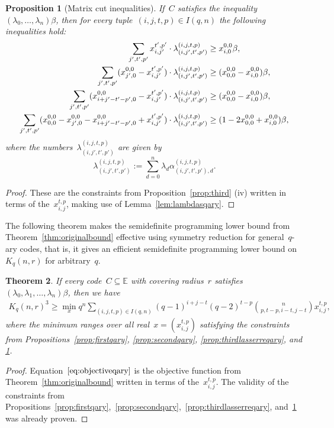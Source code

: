 \documentclass[10pt,a4paper]{article}
\newtheorem{theorem}{Theorem}[section]
\newtheorem{proposition}[theorem]{Proposition}
\theoremstyle{definition}
\begin{document}
\begin{proposition}[Matrix cut inequalities]\label{prop:thirdmatrixcutqary} If~$C$ satisfies the inequality $(\lambda_0,\ldots,\lambda_n)\beta$, then for every tuple~$(i,j,t,p) \in I(q,n)$ the following inequalities hold:
\begin{align} \label{constraints:matrixcutqary}
    \sum_{j',t',p'} x_{i,j'}^{t',p'} \cdot \lambda_{(i,j',t',p')}^{(i,j,t,p)} & \geq x_{i,0}^{0,0} \beta, \\
    \sum_{j',t',p'} (x_{j',0}^{0,0} - x_{i,j'}^{t',p'}) \cdot \lambda_{(i,j',t',p')}^{(i,j,t,p)}& \geq (x_{0,0}^{0,0} -  x_{i,0}^{0,0}) \beta, \notag\\
    \sum_{j',t',p'} (x_{i+j'-t'-p',0}^{0,0} - x_{i,j'}^{t',p'} )\cdot \lambda_{(i,j',t',p')}^{(i,j,t,p)} & \geq (x_{0,0}^{0,0} -  x_{i,0}^{0,0}) \beta,\notag\\
    \sum_{j',t',p'} (x_{0,0}^{0,0} - x_{j',0}^{0,0} -x_{i+j'-t'-p',0}^{0,0} + x_{i,j'}^{t',p'} )\cdot \lambda_{(i,j',t',p')}^{(i,j,t,p)} & \geq (1-2x_{0,0}^{0,0} +  x_{i,0}^{0,0}) \beta, \notag
\end{align}
where the numbers~$\lambda_{(i,j',t',p')}^{(i,j,t,p)}$ are given by
\[
\lambda_{(i,j',t',p')}^{(i,j,t,p)} := \sum_{d=0}^n \lambda_d \alpha_{(i,j',t',p'),d}^{(i,j,t,p)}.
\]
\end{proposition}
\begin{proof} 
These are the constraints from Proposition~\ref{prop:third} (iv) written in terms of the~$x_{i,j}^{t,p}$, making use of Lemma~\ref{lem:lambdasqary}. 
\end{proof} 


The following theorem makes the semidefinite programming lower bound from Theorem~\ref{thm:originalbound} effective using symmetry reduction for general~$q$-ary codes, that is, it gives an efficient semidefinite programming lower bound on~$K_q(n,r)$ for arbitrary~$q$.
\begin{theorem} \label{thm:sdplowerboundqary}
If every code~$C \subseteq \mathbb{E}$ with covering radius~$r$ satisfies $(\lambda_0,\lambda_1,\ldots,\lambda_n)\beta$, then we have
\begin{align}\label{eq:objectiveqary}
    K_q(n,r)^3 \geq \min_x q^n\sum_{(i,j,t,p)\in I(q,n)} (q-1)^{i+j-t}(q-2)^{t-p}\binom{n}{p,t-p,i-t,j-t}  x_{i,j}^{t,p} , 
\end{align}
where the minimum ranges over all real~$x=(x_{i,j}^{t,p})$ satisfying the constraints from Propositions~\ref{prop:firstqary}, \ref{prop:secondqary}, \ref{prop:thirdlasserreqary}, and  \ref{prop:thirdmatrixcutqary}.
\end{theorem}
\begin{proof}
 Equation~$\eqref{eq:objectiveqary}$ is the objective function from Theorem~\ref{thm:originalbound} written in terms of the~$x_{i,j}^{t,p}$.
 The validity of the constraints from Propositions~\ref{prop:firstqary},~\ref{prop:secondqary},~\ref{prop:thirdlasserreqary}, and~\ref{prop:thirdmatrixcutqary} was already proven.   
 \end{proof} 
\end{document}
